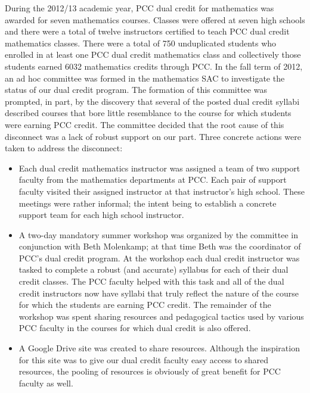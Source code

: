 During the 2012/13 academic year, PCC dual credit for mathematics was awarded for seven mathematics courses.  Classes were offered at seven high schools and there were a total of twelve instructors certified to teach PCC dual credit mathematics classes.  There were a total of 750 unduplicated students who enrolled in at least one PCC dual credit mathematics class and collectively those students earned 6032 mathematics credits through PCC.
In the fall term of 2012, an ad hoc committee was formed in the mathematics SAC to investigate the status of our dual credit program.  The formation of this committee was prompted, in part, by the discovery that several of the posted dual credit syllabi described courses that bore little resemblance to the course for which students were earning PCC credit.  The committee decided that the root cause of this disconnect was a lack of robust support on our part.  Three concrete actions were taken to address the disconnect:
\begin{itemize}
\item Each dual credit mathematics instructor was assigned a team of two support faculty from the mathematics departments at PCC.  Each pair of support faculty visited their assigned instructor at that instructor's high school.  These meetings were rather informal; the intent being to establish a concrete support team for each high school instructor.
\item A two-day mandatory summer workshop was organized by the committee in conjunction with Beth Molenkamp; at that time Beth was the coordinator of PCC's dual credit program.  At the workshop each dual credit instructor was tasked to complete a robust (and accurate) syllabus for each of their dual credit classes.  The PCC faculty helped with this task and all of the dual credit instructors now have syllabi that truly reflect the nature of the course for which the students are earning PCC credit.  The remainder of the workshop was spent sharing resources and pedagogical tactics used by various PCC faculty in the courses for which dual credit is also offered.
\item A Google Drive site was created to share resources.  Although the inspiration for this site was to give our dual credit faculty easy access to shared resources, the pooling of resources is obviously of great benefit for PCC faculty as well.
\end{itemize}

